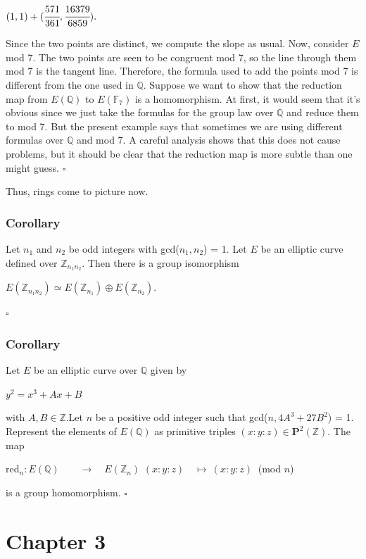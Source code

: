 \documentclass[a4paper, 12pt]{article}
\begin{document}
\begin{center} $(1, 1) + (\cfrac{571}{361}, \cfrac{16379}{6859}).$ \end{center}
Since the two points are distinct, we compute the slope as usual. Now, consider $E$ mod 7. The two points are seen to be congruent mod 7, so the line through them mod 7 is the tangent line. Therefore, the formula used to add the points mod 7 is different from the one used in $\mathbb{Q}$. Suppose we want to show that the reduction map from $E(\mathbb{Q})$ to $E(\mathbb{F}_7)$ is a homomorphism. At first, it would seem that it's obvious since we just take the formulas for the group law over $\mathbb{Q}$ and reduce them to mod 7. But the present example says that sometimes we are using different formulas over $\mathbb{Q}$ and mod 7. A careful analysis shows that this does not cause problems, but it should be clear that the reduction map is more subtle than one might guess. $\square$ \par
Thus, rings come to picture now.
\subsubsection {Corollary}
Let $n_1$ and $n_2$ be odd integers with gcd($n_1,n_2$) = 1. Let $E$ be an elliptic curve defined over $\mathbb{Z}_{n_1n_2}$. Then there is a group isomorphism
\begin{center} $E(\mathbb{Z}_{n_1n_2}) \simeq E(\mathbb{Z}_{n_1}) \oplus E(\mathbb{Z}_{n_2}).$ \end{center}
$\square$
\subsubsection{Corollary}
Let $E$ be an elliptic curve over $\mathbb{Q}$ given by
\begin{center} $y^2=x^3+Ax+B$ \end{center}
with $A, B \in \mathbb{Z}$.\newline Let $n$ be a positive odd integer such that gcd($n, 4A^3+27B^2$) = 1. Represent the elements of $E(\mathbb{Q})$ as primitive triples $(x:y:z) \in \textbf{P}^2(\mathbb{Z})$. The map
\begin{center}
red$_n:E(\mathbb{Q}) \qquad \longrightarrow \quad E(\mathbb{Z}_n)$ \newline
$(x:y:z) \quad\mapsto \:(x:y:z) \:$ (mod $n$) 
\end{center}
is a group homomorphism. $\square$
\section {Chapter 3}
\end{document}
